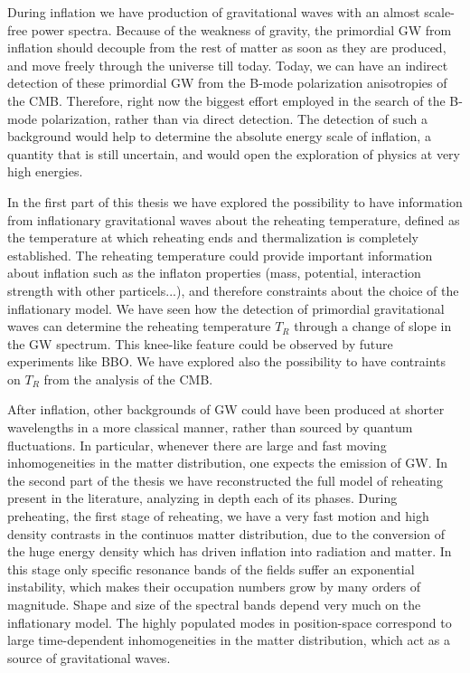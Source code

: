 \documentclass[11pt,a4paper,twoside]{book}
\begin{document}
During inflation we have production of gravitational waves with an almost scale-free power spectra. Because of the weakness of gravity, the primordial GW from inflation should decouple from the rest of matter as soon as they are produced, and move freely through the universe till today. Today, we can have an indirect detection of these primordial GW from the B-mode polarization anisotropies of the CMB. Therefore, right now the biggest effort employed in the search of the B-mode polarization, rather than via direct detection. The detection of such a background would help to determine the absolute energy scale of inflation, a quantity that is still uncertain, and would open the exploration of physics at very high energies.

In the first part of this thesis we have explored the possibility to have information from inflationary gravitational waves about the reheating temperature, defined as the temperature at which reheating ends and thermalization is completely established. The reheating temperature could provide important information about inflation such as the inflaton properties (mass, potential, interaction strength with other particels...), and therefore constraints about the choice of the inflationary model. We have seen how the detection of primordial gravitational waves can determine the reheating temperature $ T_{R} $ through a change of slope in the GW spectrum. This knee-like feature could be observed by future experiments like BBO. We have explored also the possibility to have contraints on $ T_{R} $ from the analysis of the CMB.

After inflation, other backgrounds of GW could have been produced at shorter wavelengths in a more classical manner, rather than sourced by quantum fluctuations. In particular, whenever there are large and fast moving inhomogeneities in the matter distribution, one expects the emission of GW. In the second part of the thesis we have reconstructed the full model of reheating present in the literature, analyzing in depth each of its phases. During preheating, the first stage of reheating, we have a very fast motion and high density contrasts in the continuos matter distribution, due to the conversion of the huge energy density which has driven inflation into radiation and matter. In this stage only specific resonance bands of the fields suffer an exponential instability, which makes their occupation numbers grow by many orders of magnitude. Shape and size of the spectral bands depend very much on the inflationary model. The highly populated modes in position-space correspond to large time-dependent inhomogeneities in the matter distribution, which act as a source  of gravitational waves.
\end{document}
